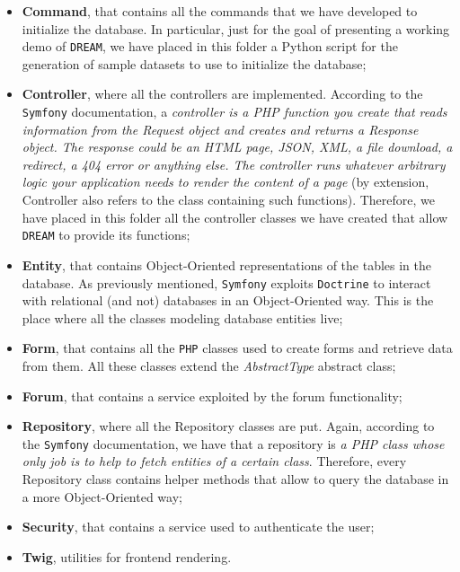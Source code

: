 \documentclass{article}
\begin{document}
\begin{itemize}
    \item \textbf{Command}, that contains all the commands that we have developed to initialize the database. In particular, just for the goal of presenting a working demo of \verb|DREAM|, we have placed in this folder a Python script for the generation of sample datasets to use to initialize the database;
    \item \textbf{Controller}, where all the controllers are implemented. According to the \verb|Symfony| documentation, a \textit{controller is a PHP function you create that reads information from the Request object and creates and returns a Response object. The response could be an HTML page, JSON, XML, a file download, a redirect, a 404 error or anything else. The controller runs whatever arbitrary logic your application needs to render the content of a page} (by extension, Controller also refers to the class containing such functions). Therefore, we have placed in this folder all the controller classes we have created that allow \verb|DREAM| to provide its functions;
    \item \textbf{Entity}, that contains Object-Oriented representations of the tables in the database. As previously mentioned, \verb|Symfony| exploits \verb|Doctrine| to interact with relational (and not) databases in an Object-Oriented way. This is the place where all the classes modeling database entities live;
    \item \textbf{Form}, that contains all the \verb|PHP| classes used to create forms and retrieve data from them. All these classes extend the \textit{AbstractType} abstract class;
    \item \textbf{Forum}, that contains a service exploited by the forum functionality;
    \item \textbf{Repository}, where all the Repository classes are put. Again, according to the \verb|Symfony| documentation, we have that a repository is \textit{a PHP class whose only job is to help to fetch entities of a certain class}. Therefore, every Repository class contains helper methods that allow to query the database in a more Object-Oriented way;
    \item \textbf{Security}, that contains a service used to authenticate the user;
    \item \textbf{Twig}, utilities for frontend rendering.
\end{itemize}
\newpage
\end{document}
